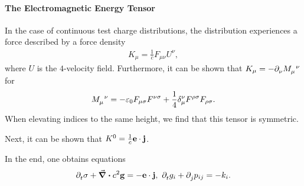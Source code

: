 \paragraph{The Electromagnetic Energy Tensor}
In the case of continuous test charge distributions, the distribution experiences a force described by a force density
\begin{align*}
	K_{\mu} = \frac{1}{c}F_{\mu\nu}U^{\nu},
\end{align*}
where $U$ is the $4$-velocity field. Furthermore, it can be shown that $K_{\mu} = -\del{\nu}{\tensor{M}{_{\mu}^{\nu}}}$ for
\begin{align*}
	\tensor{M}{_{\mu}^{\nu}} = -\varepsilon_{0}F_{\mu\sigma}F^{\nu\sigma} + \frac{1}{4}\kdelta{\nu}{\mu}F^{\rho\sigma}F_{\rho\sigma}.
\end{align*}
When elevating indices to the same height, we find that this tensor is symmetric.

Next, it can be shown that $K^{0} = \frac{1}{c}\vb{e}\cdot\vb{j}$.

In the end, one obtains equations
\begin{align*}
	\del{t}{\sigma} + \div{c^{2}\vb{g}} = -\vb{e}\cdot\vb{j},\ \del{t}{g_{i}} + \del{j}{p_{ij}} = -k_{i}.
\end{align*}
